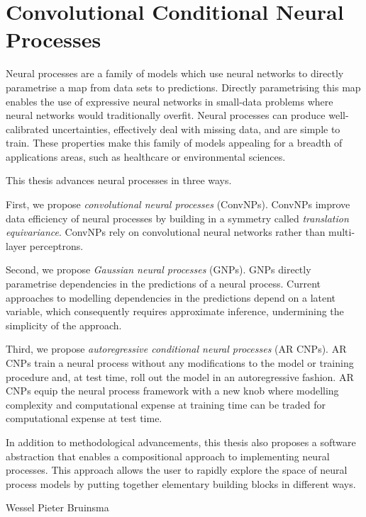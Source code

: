 \documentclass[12pt]{report}
\begin{document}
\chapter*{Convolutional Conditional \newline Neural Processes}

Neural processes are a family of models which use neural networks to directly parametrise a  map from data sets to predictions.
Directly parametrising this map enables the use of expressive neural networks in small-data problems where neural networks would traditionally overfit.
Neural processes
can produce well-calibrated uncertainties,
effectively deal with missing data,
and are simple to train.
These properties make this family of models appealing for a breadth of applications areas, such as healthcare or environmental sciences.

This thesis advances neural processes in three ways.

First, we propose \emph{convolutional neural processes} (ConvNPs).
ConvNPs improve data efficiency of neural processes by building in a symmetry called \emph{translation equivariance}.
ConvNPs rely on convolutional neural networks rather than multi-layer perceptrons. %

Second, we propose \emph{Gaussian neural processes} (GNPs).
GNPs directly parametrise dependencies in the predictions of a neural process.
Current approaches to modelling dependencies in the predictions depend on a latent variable, which consequently requires approximate inference, undermining the simplicity of the approach.

Third, we propose \emph{autoregressive conditional neural processes} (AR CNPs).
AR CNPs train a neural process without any modifications to the model or training procedure and, at test time, roll out the model in an autoregressive fashion. %
AR CNPs equip the neural process framework with a new knob where modelling complexity and computational expense at training time can be traded for computational expense at test time.

In addition to methodological advancements, this thesis also proposes a software abstraction that enables a compositional approach to implementing neural processes.
This approach allows the user to rapidly explore the space of neural process models by putting together elementary building blocks in different ways.

\raggedleft
Wessel Pieter Bruinsma
\end{document}
